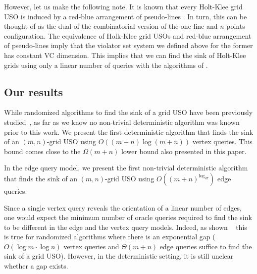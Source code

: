 \documentclass[runningheads,a4paper]{llncs}
\begin{document}
However, let us make the following note. 
It is known that every Holt-Klee grid USO is induced by a red-blue arrangement of pseudo-lines \cite{grid05,falkthesis}. 
In turn, this can be thought of as the dual of the combinatorial version of the one line and $n$ points configuration.
The equivalence of Holk-Klee grid USOs and red-blue arrangement of pseudo-lines imply that the violator set system we defined above for the former
has constant VC dimension. This implies that we can find the sink of Holt-Klee grids using only a linear number of queries with the algorithms of \cite{chan16,ChazelleM96}.




\subsection{Our results}

While randomized algorithms to find the sink of a grid USO have been previously studied~\cite{grid05,linepoint,grid08,falkthesis}, as far as we know no non-trivial deterministic algorithm was known prior to this work. 
We present the first deterministic algorithm that finds the sink of an $(m,n)$-grid USO using $O((m+n)\log (m+n))$ vertex queries.
This bound comes close to the $\Omega(m+n)$ lower bound also presented in this paper.

In the edge query model, 
we present the first non-trivial deterministic algorithm that finds the sink of an $(m, n)$-grid USO using $O((m+n)^{\log_47})$ edge queries. 

Since a single vertex query reveals the orientation of a linear number of edges, one would expect the minimum number of  oracle queries required to find the sink to be different in the edge and the vertex query models.
Indeed, as shown ~\citet{grid08} this is true for randomized algorithms where there is an exponential gap ($O(\log m\cdot \log n)$ vertex queries and $\Theta(m+n)$ edge queries suffice to find the sink of a grid USO).
However, in the deterministic setting, it is still unclear whether a gap exists.
\end{document}
